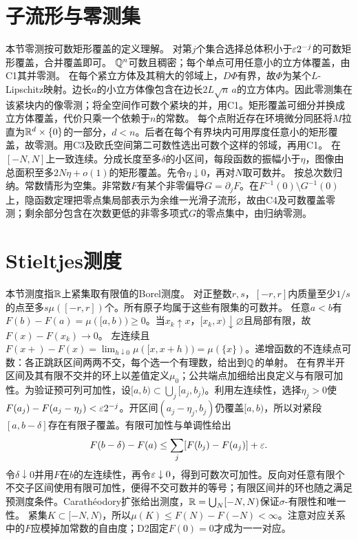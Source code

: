 \documentclass[UTF8,fontset=fandol,11pt]{ctexart}
\begin{document}
\section{子流形与零测集}
本节零测按可数矩形覆盖的定义理解。
对第$j$个集合选择总体积小于$\varepsilon2^{-j}$的可数矩形覆盖，合并覆盖即可。
$\mathbb Q^n$可数且稠密；每个单点可用任意小的立方体覆盖，由C1其并零测。
在每个紧立方体及其稍大的邻域上，$D\Phi$有界，故$\Phi$为某个$L$-Lipschitz映射。边长$a$的小立方体像包含在边长$2L\sqrt n\,a$的立方体内。因此零测集在该紧块内的像零测；将全空间作可数个紧块的并，用C1。矩形覆盖可细分并换成立方体覆盖，代价只乘一个依赖于$n$的常数。
每个点附近存在环境微分同胚将$M$拉直为$\mathbb R^d\times\{0\}$的一部分，$d<n$。后者在每个有界块内可用厚度任意小的矩形覆盖，故零测。用C3及欧氏空间第二可数性选出可数个这样的邻域，再用C1。
在$[-N,N]$上一致连续。分成长度至多$\delta$的小区间，每段函数的振幅小于$\eta$，图像由总面积至多$2N\eta+o(1)$的矩形覆盖。先令$\eta\downarrow0$，再对$N$取可数并。
按总次数归纳。常数情形为空集。非常数$F$有某个非零偏导$G=\partial_jF$。在$F^{-1}(0)\setminus G^{-1}(0)$上，隐函数定理把零点集局部表示为余维一光滑子流形，故由C4及可数覆盖零测；剩余部分包含在次数更低的非零多项式$G$的零点集中，由归纳零测。
\section{Stieltjes测度}
本节测度指$\mathbb R$上紧集取有限值的Borel测度。
对正整数$r,s$，$[-r,r]$内质量至少$1/s$的点至多$s\mu([-r,r])$个。所有原子均属于这些有限集的可数并。
\problem{D2}{定义$F(x)=\mu([0,x))$（$x\ge0$），$F(x)=-\mu([x,0))$（$x<0$）。证明$F$递增且左连续。}
任意$a<b$有$F(b)-F(a)=\mu([a,b))\ge0$。当$x_k\uparrow x$，$[x_k,x)\downarrow\varnothing$且局部有限，故$F(x)-F(x_k)\to0$。
左连续且$F(x+)-F(x)=\lim_{h\downarrow0}\mu([x,x+h))=\mu(\{x\})$。递增函数的不连续点可数：各正跳跃区间两两不交，每个选一个有理数，给出到$\mathbb Q$的单射。
\problem{D4}{任给左连续递增实函数$F$，证明存在唯一Borel测度$\mu$使$\mu([a,b))=F(b)-F(a)$。}
在有界半开区间及其有限不交并的环上以差值定义$\mu_0$；公共端点加细给出良定义与有限可加性。为验证预可列可加性，设$[a,b)\subset\bigcup_j[a_j,b_j)$。利用左连续性，选择$\eta_j>0$使$F(a_j)-F(a_j-\eta_j)<\varepsilon2^{-j}$。开区间$(a_j-\eta_j,b_j)$仍覆盖$[a,b)$，所以对紧段$[a,b-\delta]$存在有限子覆盖。有限可加性与单调性给出
\[F(b-\delta)-F(a)\le\sum_j[F(b_j)-F(a_j)]+\varepsilon.\]
令$\delta\downarrow0$并用$F$在$b$的左连续性，再令$\varepsilon\downarrow0$，得到可数次可加性。反向对任意有限个不交子区间使用有限可加性，便得不交可数并的等号；有限区间并的环也随之满足预测度条件。Carathéodory扩张给出测度，$\mathbb R=\bigcup_N[-N,N)$保证$\sigma$-有限性和唯一性。
紧集$K\subset[-N,N)$，所以$\mu(K)\le F(N)-F(-N)<\infty$。注意对应关系中的$F$应模掉加常数的自由度；D2固定$F(0)=0$才成为一一对应。
\end{document}
